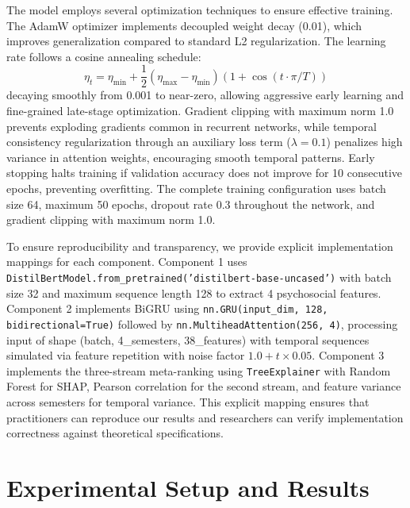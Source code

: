 \documentclass[journal]{IEEEtran}
\begin{document}
The model employs several optimization techniques to ensure effective training. The AdamW optimizer implements decoupled weight decay (0.01), which improves generalization compared to standard L2 regularization. The learning rate follows a cosine annealing schedule:
\begin{equation}
\eta_t = \eta_{\min} + \frac{1}{2}(\eta_{\max} - \eta_{\min})(1 + \cos(t \cdot \pi/T))
\end{equation}
decaying smoothly from 0.001 to near-zero, allowing aggressive early learning and fine-grained late-stage optimization. Gradient clipping with maximum norm 1.0 prevents exploding gradients common in recurrent networks, while temporal consistency regularization through an auxiliary loss term ($\lambda = 0.1$) penalizes high variance in attention weights, encouraging smooth temporal patterns. Early stopping halts training if validation accuracy does not improve for 10 consecutive epochs, preventing overfitting. The complete training configuration uses batch size 64, maximum 50 epochs, dropout rate 0.3 throughout the network, and gradient clipping with maximum norm 1.0.

To ensure reproducibility and transparency, we provide explicit implementation mappings for each component. Component 1 uses \texttt{DistilBertModel.from\_pretrained('distilbert-base-uncased')} with batch size 32 and maximum sequence length 128 to extract 4 psychosocial features. Component 2 implements BiGRU using \texttt{nn.GRU(input\_dim, 128, bidirectional=True)} followed by \texttt{nn.MultiheadAttention(256, 4)}, processing input of shape (batch, 4\_semesters, 38\_features) with temporal sequences simulated via feature repetition with noise factor $1.0 + t \times 0.05$. Component 3 implements the three-stream meta-ranking using \texttt{TreeExplainer} with Random Forest for SHAP, Pearson correlation for the second stream, and feature variance across semesters for temporal variance. This explicit mapping ensures that practitioners can reproduce our results and researchers can verify implementation correctness against theoretical specifications.

\section{Experimental Setup and Results}
\end{document}
